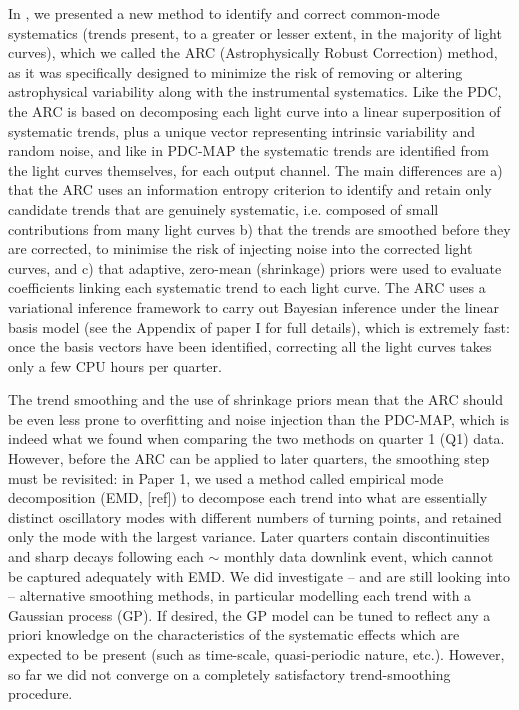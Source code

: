 \documentclass[useAMS,usenatbib]{mn2e}
\begin{document}
In \citet[][hereafter Paper I]{rob+13}, we presented a new method to
identify and correct common-mode systematics (trends present, to a
greater or lesser extent, in the majority of light curves), which we
called the ARC (Astrophysically Robust Correction) method, as it was
specifically designed to minimize the risk of removing or altering
astrophysical variability along with the instrumental
systematics. Like the PDC, the ARC is based on decomposing each light
curve into a linear superposition of systematic trends, plus a unique
vector representing intrinsic variability and random noise, and like
in PDC-MAP the systematic trends are identified from the light curves
themselves, for each output channel. The main differences are a) that
the ARC uses an information entropy criterion to identify and retain
only candidate trends that are genuinely systematic, i.e. composed of
small contributions from many light curves b) that the trends are
smoothed before they are corrected, to minimise the risk of
injecting noise into the corrected light curves, and c) that adaptive,
zero-mean (shrinkage) priors were used to evaluate coefficients
linking each systematic trend to each light curve. The ARC uses a
variational inference framework to carry out Bayesian inference under the linear basis
model (see the Appendix of paper I for full details), which is
extremely fast: once the basis vectors have been identified,
correcting all the light curves takes only a few CPU hours per quarter.

The trend smoothing and the use of shrinkage priors mean that the ARC should be
even less prone to overfitting and noise injection than the PDC-MAP,
which is indeed what we found when comparing the two methods on
quarter 1 (Q1) data. However, before the ARC can be applied to later
quarters, the smoothing step must be revisited: in Paper 1, we used a
method called empirical mode decomposition (EMD, [ref]) to decompose
each trend into what are essentially distinct oscillatory modes with
different numbers of turning points, and retained only the mode with
the largest variance. Later quarters contain discontinuities and sharp
decays following each $\sim$ monthly data downlink event, which cannot
be captured adequately with EMD. We did investigate -- and are still
looking into -- alternative smoothing methods, in particular
modelling each trend with a Gaussian process (GP). If desired, the GP
model can be tuned to reflect any a priori knowledge on the
characteristics of the systematic effects which are expected to be
present (such as time-scale, quasi-periodic nature,
etc.). However, so far we did not converge on a completely
satisfactory trend-smoothing procedure.
\end{document}
